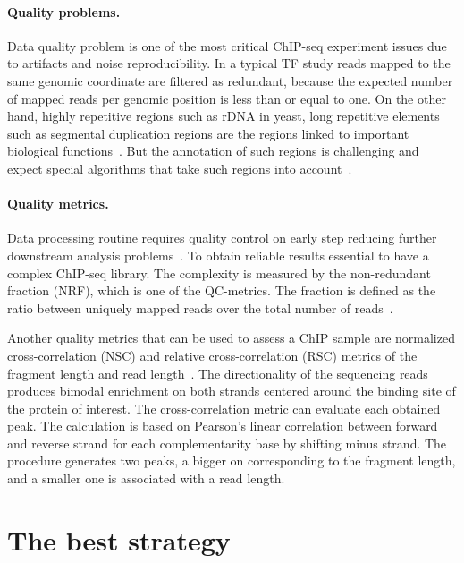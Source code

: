 \paragraph{Quality problems.}
Data quality problem is one of the most critical ChIP-seq experiment issues due to artifacts and noise reproducibility.
In a typical TF study reads mapped to the same genomic coordinate are filtered as redundant, because the expected number of mapped reads per genomic position is less than or equal to one. 
On the other hand, highly repetitive regions such as rDNA in yeast, long repetitive elements such as segmental duplication regions are the regions linked to important biological functions~\cite{nakato2017recent}. But the annotation of such regions is challenging and expect special algorithms that take such regions into account~\cite{chung2011discovering}.

\paragraph{Quality metrics.}
Data processing routine requires quality control on early step reducing further downstream analysis problems~\cite{ewels2016multiqc}.
To obtain reliable results essential to have a complex ChIP-seq library.
The complexity is measured by the non-redundant fraction (NRF), which is one of the QC-metrics.
The fraction is defined as the ratio between uniquely mapped reads over the total number of reads~\cite{landt2012chip}.

Another quality metrics that can be used to assess a ChIP sample are normalized cross-correlation (NSC) and relative cross-correlation (RSC) metrics of the fragment length and read length~\cite{landt2012chip, marinov2014large}. 
The directionality of the sequencing reads produces bimodal enrichment on both strands centered around the binding site of the protein of interest. 
The cross-correlation metric can evaluate each obtained peak. 
The calculation is based on Pearson's linear correlation between forward and reverse strand for each complementarity base by shifting minus strand. 
The procedure generates two peaks, a bigger on corresponding to the fragment length, and a smaller one is associated with a read length. 



\section{The best strategy}
\label{strategy}

